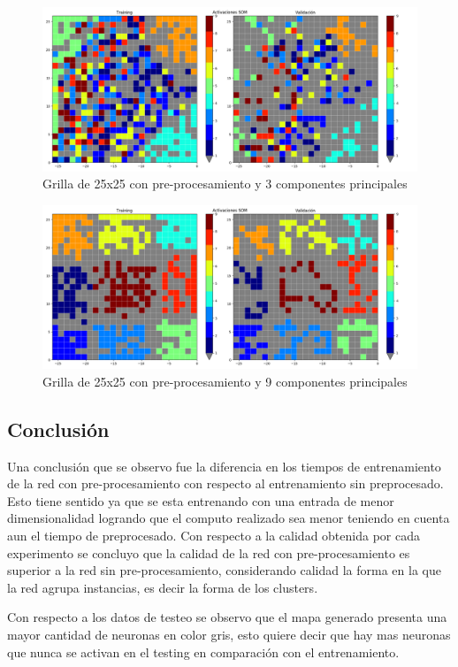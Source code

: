 \begin{figure}[H]
  \includegraphics[width=160mm]{imagenes/som_25_25_3_preprocess.png}
  \caption{Grilla de 25x25 con pre-procesamiento y 3 componentes principales}
\end{figure}

\begin{figure}[H]
  \includegraphics[width=160mm]{imagenes/som_25_25_9_preprocess.png}
  \caption{Grilla de 25x25 con pre-procesamiento y 9 componentes principales}
\end{figure}

\subsection{Conclusión}
Una conclusión que se observo fue la diferencia en los tiempos de entrenamiento
de la red con pre-procesamiento con respecto al entrenamiento sin preprocesado.
Esto tiene sentido ya que se esta entrenando con una entrada de menor
dimensionalidad logrando que el computo realizado sea menor teniendo en cuenta
aun el tiempo de  preprocesado.  Con respecto a la calidad obtenida por cada
experimento se concluyo que la calidad de la red con pre-procesamiento es
superior a la red sin pre-procesamiento, considerando calidad
la forma en la que la red agrupa instancias, es decir la forma de los clusters.

Con respecto a los datos de testeo se observo que el mapa generado presenta una
mayor cantidad de neuronas en color gris, esto quiere decir que hay mas
neuronas que nunca se activan en el testing en comparación con el
entrenamiento.

